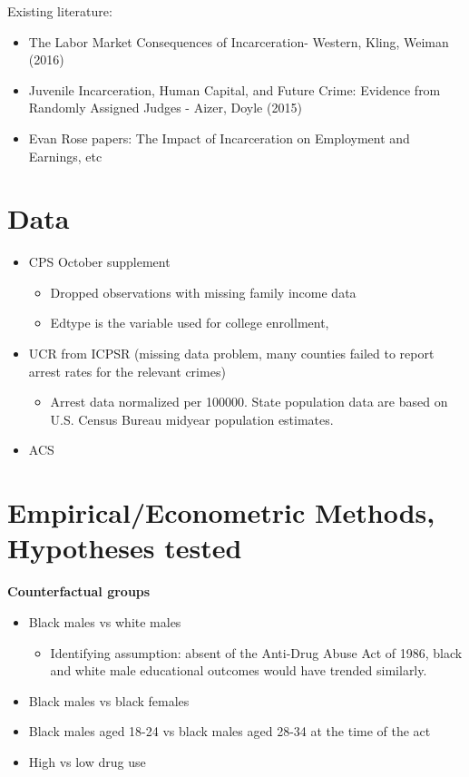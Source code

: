 \documentclass{article}
\begin{document}
Existing literature:
\begin{itemize}[itemsep=0.05mm, parsep=0pt]
  \item The Labor Market Consequences of Incarceration- Western, Kling, Weiman (2016)
  \item Juvenile Incarceration, Human Capital, and Future Crime: Evidence from Randomly Assigned Judges - Aizer, Doyle (2015)
  \item Evan Rose papers: The Impact of Incarceration on Employment and Earnings, etc
\end{itemize}


\section*{Data}

\begin{itemize}[itemsep=0.05mm, parsep=0pt]
  \item CPS October supplement
  \begin{itemize}
    \item Dropped observations with missing family income data
    \item Edtype is the variable used for college enrollment, 
  \end{itemize}
  \item UCR from ICPSR (missing data problem, many counties failed to report arrest rates for the relevant crimes)
  \begin{itemize}
    \item Arrest data normalized per 100000. State population data are based on U.S. Census Bureau midyear population estimates.
  \end{itemize}
  \item ACS
\end{itemize}

\section*{Empirical/Econometric Methods, Hypotheses tested}

\textbf{Counterfactual groups}
\begin{itemize}[itemsep=0.05mm, parsep=0pt]
  \item Black males vs white males
  \begin{itemize}
    \item Identifying assumption: absent of the Anti-Drug Abuse Act of 1986, black and white male educational outcomes would have trended similarly.
  \end{itemize}
  \item Black males vs black females
  \item Black males aged 18-24 vs black males aged 28-34 at the time of the act
  \item High vs low drug use
\end{itemize}
\end{document}
